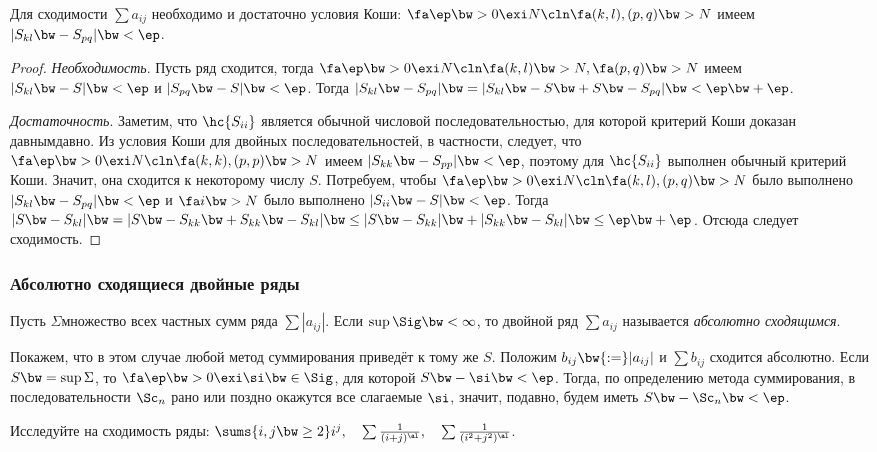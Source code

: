 \documentclass[a4paper]{article}
\begin{document}
\begin{theorem}
Для сходимости $\sum a_{ij}$ необходимо и достаточно условия Коши:
$\fa \ep \bw> 0 \exi N\cln \fa (k, l), (p,q) \bw> N$ имеем $|S_{kl} \bw- S_{pq}| \bw< \ep$.
\end{theorem}
\begin{proof}
\emph{Необходимость}. Пусть ряд сходится, тогда $\fa \ep \bw> 0 \exi N\cln \fa (k,l) \bw> N, \fa (p,q) \bw> N$
имеем $|S_{kl} \bw- S| \bw< \ep$ и $|S_{pq} \bw- S| \bw< \ep$. Тогда
$|S_{kl} \bw- S_{pq}| \bw= |S_{kl} \bw- S \bw+ S \bw- S_{pq}| \bw< \ep \bw+ \ep$.

\emph{Достаточность}. Заметим, что $\hc{S_{ii}}$ является обычной числовой последовательностью,
для которой критерий Коши доказан давным\д давно. Из условия Коши для двойных последовательностей, в частности,
следует, что $\fa \ep \bw> 0 \exi N\cln \fa (k,k), (p,p) \bw> N$ имеем $|S_{kk} \bw- S_{pp}| \bw< \ep$, поэтому
для $\hc{S_{ii}}$ выполнен обычный критерий Коши. Значит, она сходится к некоторому числу $S$.
Потребуем, чтобы $\fa \ep \bw> 0 \exi N\cln \fa (k,l), (p,q) \bw> N$ было выполнено $|S_{kl} \bw- S_{pq}| \bw< \ep$ и
$\fa i \bw> N$ было выполнено $|S_{ii} \bw- S| \bw< \ep$. Тогда $|S \bw- S_{kl}| \bw=
|S \bw- S_{kk} \bw+ S_{kk} \bw- S_{kl}| \bw\le |S \bw- S_{kk}| \bw+ |S_{kk} \bw- S_{kl}| \bw\le \ep \bw+ \ep$.
Отсюда следует сходимость.
\end{proof}

\subsubsection{Абсолютно сходящиеся двойные ряды}
\begin{df}
Пусть $\Sigma$\т множество всех частных сумм ряда $\sum |a_{ij}|$. Если $\sup \Sig \bw< \infty$,
то двойной ряд $\sum a_{ij}$ называется \emph{абсолютно сходящимся}.
\end{df}

Покажем, что в этом случае любой метод суммирования приведёт к тому же $S$. Положим
$b_{ij} \bw{:=} |a_{ij}|$ и $\sum b_{ij}$ сходится
абсолютно. Если $S \bw= \sup \Sigma$, то $\fa \ep \bw> 0 \exi \si \bw\in \Sig$, для
которой $S \bw- \si \bw< \ep$. Тогда, по определению метода суммирования, в последовательности
$\Sc_n$ рано или поздно окажутся все слагаемые $\si$, значит, подавно, будем иметь $S \bw- \Sc_n \bw< \ep$.

\begin{ex}
Исследуйте на сходимость ряды: $\sums{i,j\bw\ge 2} i^j,
\quad \sum \frac1{(i + j)^\al}, \quad \sum \frac1{(i^2 + j^2)^\al}$.
\end{ex}
\end{document}
